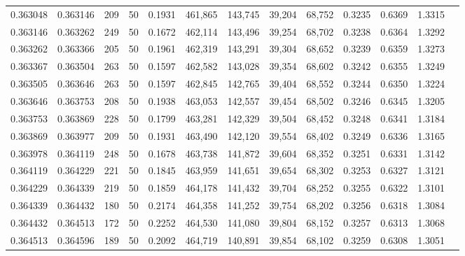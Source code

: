 \begin{tabular}{rrrrrrrrrrrrr}
0.363048 & 0.363146 &   209 &  50 &                                     0.1931 & 461,865 & 143,745 &  39,204 &  68,752 & 0.3235 & 0.6369 & 1.3315 \\
0.363146 & 0.363262 &   249 &  50 &                                     0.1672 & 462,114 & 143,496 &  39,254 &  68,702 & 0.3238 & 0.6364 & 1.3292 \\
0.363262 & 0.363366 &   205 &  50 &                                     0.1961 & 462,319 & 143,291 &  39,304 &  68,652 & 0.3239 & 0.6359 & 1.3273 \\
0.363367 & 0.363504 &   263 &  50 &                                     0.1597 & 462,582 & 143,028 &  39,354 &  68,602 & 0.3242 & 0.6355 & 1.3249 \\
0.363505 & 0.363646 &   263 &  50 &                                     0.1597 & 462,845 & 142,765 &  39,404 &  68,552 & 0.3244 & 0.6350 & 1.3224 \\
0.363646 & 0.363753 &   208 &  50 &                                     0.1938 & 463,053 & 142,557 &  39,454 &  68,502 & 0.3246 & 0.6345 & 1.3205 \\
0.363753 & 0.363869 &   228 &  50 &                                     0.1799 & 463,281 & 142,329 &  39,504 &  68,452 & 0.3248 & 0.6341 & 1.3184 \\
0.363869 & 0.363977 &   209 &  50 &                                     0.1931 & 463,490 & 142,120 &  39,554 &  68,402 & 0.3249 & 0.6336 & 1.3165 \\
0.363978 & 0.364119 &   248 &  50 &                                     0.1678 & 463,738 & 141,872 &  39,604 &  68,352 & 0.3251 & 0.6331 & 1.3142 \\
0.364119 & 0.364229 &   221 &  50 &                                     0.1845 & 463,959 & 141,651 &  39,654 &  68,302 & 0.3253 & 0.6327 & 1.3121 \\
0.364229 & 0.364339 &   219 &  50 &                                     0.1859 & 464,178 & 141,432 &  39,704 &  68,252 & 0.3255 & 0.6322 & 1.3101 \\
0.364339 & 0.364432 &   180 &  50 &                                     0.2174 & 464,358 & 141,252 &  39,754 &  68,202 & 0.3256 & 0.6318 & 1.3084 \\
0.364432 & 0.364513 &   172 &  50 &                                     0.2252 & 464,530 & 141,080 &  39,804 &  68,152 & 0.3257 & 0.6313 & 1.3068 \\
0.364513 & 0.364596 &   189 &  50 &                                     0.2092 & 464,719 & 140,891 &  39,854 &  68,102 & 0.3259 & 0.6308 & 1.3051 \\

\end{tabular}
